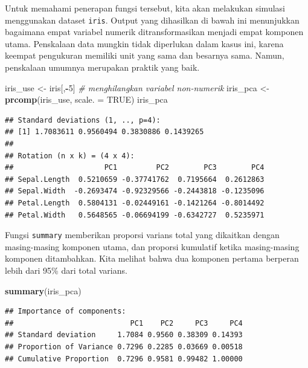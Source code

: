 \documentclass[]{book}
\newenvironment{Shaded}{\begin{snugshade}}{\end{snugshade}}
\newcommand{\CommentTok}[1]{\textcolor[rgb]{0.56,0.35,0.01}{\textit{#1}}}
\newcommand{\DataTypeTok}[1]{\textcolor[rgb]{0.13,0.29,0.53}{#1}}
\newcommand{\DecValTok}[1]{\textcolor[rgb]{0.00,0.00,0.81}{#1}}
\newcommand{\KeywordTok}[1]{\textcolor[rgb]{0.13,0.29,0.53}{\textbf{#1}}}
\newcommand{\NormalTok}[1]{#1}
\newcommand{\OperatorTok}[1]{\textcolor[rgb]{0.81,0.36,0.00}{\textbf{#1}}}
\newcommand{\OtherTok}[1]{\textcolor[rgb]{0.56,0.35,0.01}{#1}}
\newcommand{\StringTok}[1]{\textcolor[rgb]{0.31,0.60,0.02}{#1}}
\theoremstyle{definition}
\theoremstyle{definition}
\theoremstyle{definition}
\theoremstyle{remark}
\begin{document}
Untuk memahami penerapan fungsi tersebut, kita akan melakukan simulasi menggunakan dataset \texttt{iris}. Output yang dihasilkan di bawah ini menunjukkan bagaimana empat variabel numerik ditransformasikan menjadi empat komponen utama. Penskalaan data mungkin tidak diperlukan dalam kasus ini, karena keempat pengukuran memiliki unit yang sama dan besarnya sama. Namun, penskalaan umumnya merupakan praktik yang baik.

\begin{Shaded}
\begin{Highlighting}[]
\NormalTok{iris_use <-}\StringTok{ }\NormalTok{iris[,}\OperatorTok{-}\DecValTok{5}\NormalTok{] }\CommentTok{# menghilangkan variabel non-numerik}
\NormalTok{iris_pca <-}\StringTok{ }\KeywordTok{prcomp}\NormalTok{(iris_use, }\DataTypeTok{scale. =} \OtherTok{TRUE}\NormalTok{)}
\NormalTok{iris_pca}
\end{Highlighting}
\end{Shaded}

\begin{verbatim}
## Standard deviations (1, .., p=4):
## [1] 1.7083611 0.9560494 0.3830886 0.1439265
## 
## Rotation (n x k) = (4 x 4):
##                     PC1         PC2        PC3        PC4
## Sepal.Length  0.5210659 -0.37741762  0.7195664  0.2612863
## Sepal.Width  -0.2693474 -0.92329566 -0.2443818 -0.1235096
## Petal.Length  0.5804131 -0.02449161 -0.1421264 -0.8014492
## Petal.Width   0.5648565 -0.06694199 -0.6342727  0.5235971
\end{verbatim}

Fungsi \texttt{summary} memberikan proporsi varians total yang dikaitkan dengan masing-masing komponen utama, dan proporsi kumulatif ketika masing-masing komponen ditambahkan. Kita melihat bahwa dua komponen pertama berperan lebih dari 95\% dari total varians.

\begin{Shaded}
\begin{Highlighting}[]
\KeywordTok{summary}\NormalTok{(iris_pca)}
\end{Highlighting}
\end{Shaded}

\begin{verbatim}
## Importance of components:
##                           PC1    PC2     PC3     PC4
## Standard deviation     1.7084 0.9560 0.38309 0.14393
## Proportion of Variance 0.7296 0.2285 0.03669 0.00518
## Cumulative Proportion  0.7296 0.9581 0.99482 1.00000
\end{verbatim}
\end{document}
